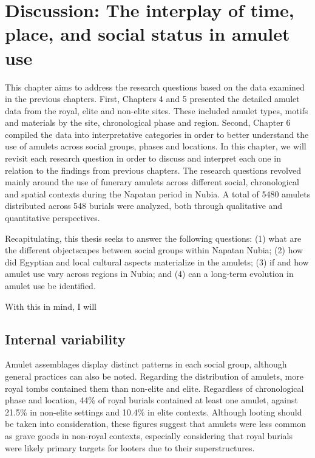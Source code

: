 \chapter{Discussion: The interplay of time, place, and social status in amulet use}

This chapter aims to address the research questions based on the data examined in the previous chapters. First, Chapters 4 and 5 presented the detailed amulet data from the royal, elite and non-elite sites. These included amulet types, motifs and materials by the site, chronological phase and region. Second, Chapter 6 compiled the data into interpretative categories in order to better understand the use of amulets across social groups, phases and locations. In this chapter, we will revisit each research question in order to discuss and interpret each one in relation to the findings from previous chapters. The research questions revolved mainly around the use of funerary amulets across different social, chronological and spatial contexts during the Napatan period in Nubia. A total of 5480 amulets distributed across 548 burials were analyzed, both through qualitative and quantitative perspectives.


Recapitulating, this thesis seeks to answer the following questions: (1) what are the different objectscapes between social groups within Napatan Nubia; (2) how did Egyptian and local cultural aspects materialize in the amulets; (3) if and how amulet use vary across regions in Nubia; and (4) can a long-term evolution in amulet use be identified.


With this in mind, I will 



\section{Internal variability}


Amulet assemblages display distinct patterns in each social group, although general practices can also be noted. Regarding the distribution of amulets, more royal tombs contained them than non-elite and elite. Regardless of chronological phase and location, 44\% of royal burials contained at least one amulet, against 21.5\% in non-elite settings and 10.4\% in elite contexts. Although looting should be taken into consideration, these figures suggest that amulets were less common as grave goods in non-royal contexts, especially considering that royal burials were likely primary targets for looters due to their superstructures. 


